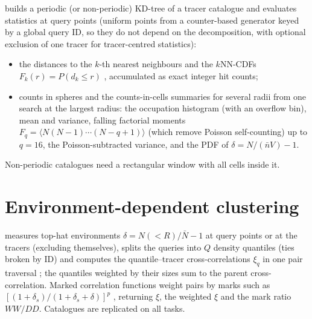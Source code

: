  builds a periodic (or non-periodic) KD-tree of a tracer catalogue and evaluates statistics at query points (uniform points from a
counter-based generator keyed by a global query ID, so they do not depend on the decomposition, with optional exclusion of one tracer for tracer-centred
statistics):
\begin{itemize}
\item the distances to the $k$-th nearest neighbours and the $k$NN-CDFs $F_k(r)=P(d_k\le r)$ \cite{Banerjee2021}, accumulated as exact integer hit counts;
\item counts in spheres and the counts-in-cells summaries for several radii from one search at the largest radius: the occupation histogram (with an overflow
      bin), mean and variance, falling factorial moments $F_q=\langle N(N-1)\cdots(N-q+1)\rangle$ (which remove Poisson self-counting) up to $q=16$, the
      Poisson-subtracted variance, and the PDF of $\delta=N/(\bar nV)-1$.
\end{itemize}
Non-periodic catalogues need a rectangular window with all cells inside it.

\section{Environment-dependent clustering}\label{sec:cs-environment}

 measures top-hat environments $\delta=N(<R)/\bar N-1$ at query points or at the tracers (excluding themselves), splits the queries
into $Q$ density quantiles (ties broken by ID) and computes the quantile--tracer cross-correlations $\xi_q$ in one pair traversal \cite{Paillas2021}; the quantiles
weighted by their sizes sum to the parent cross-correlation. Marked correlation functions weight pairs by marks such as $[(1+\delta_s)/(1+\delta_s+\delta)]^p$
\cite{White2016}, returning $\xi$, the weighted $\xi$ and the mark ratio $WW/DD$. Catalogues are replicated on all tasks.
